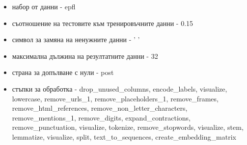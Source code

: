 \documentclass{article}
\begin{document}
\begin{itemize}
\begin{itemize}
\item набор от данни - epfl
\item съотношение на тестовите към тренировъчните данни - 0.15
\item символ за замяна на ненужните данни - ' '
\item максимална дължина на резултатните данни - 32
\item страна за допълване с нули - post
\item стъпки за обработка - drop\_unused\_columns, encode\_labels, visualize, lowercase, remove\_urls\_1,
remove\_placeholders\_1, remove\_frames, remove\_html\_references, remove\_non\_letter\_characters,
remove\_mentions\_1, remove\_digits, expand\_contractions, remove\_punctuation, visualize, tokenize,
remove\_stopwords, visualize, stem, lemmatize, visualize, split, text\_to\_sequences, create\_embedding\_matrix
\end{itemize}


\end{itemize}
\end{document}

